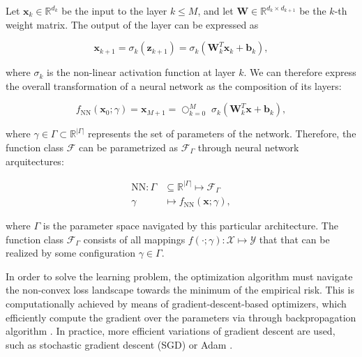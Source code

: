 \begin{definition}
    Let $\bm{x}_k \in \mathbb{R}^{d_k}$ be the input to the layer $k \leq M$, and 
    let $\bm{W} \in \mathbb{R}^{d_k \times d_{k+1}}$ be the $k$-th weight matrix. 
    The output of the layer can be expressed as
    
    $$
    \bm{x}_{k+1} = \sigma_k(\bm{z}_{k+1}) = \sigma_k(\bm{W}_k^T \bm{x}_k + \bm{b}_k),
    $$
    
    where $\sigma_k$ is the non-linear activation function at layer $k$. We 
    can therefore express the overall transformation of a neural network
    as the composition of its layers:
    
    $$
    f_{\operatorname{NN}}(\bm{x}_0; \gamma) = \bm{x}_{M+1} = \bigcirc_{k=0}^{M} \; \sigma_k(\bm{W}_k^T \bm{x} + \bm{b}_k),
    $$
    
    where $\gamma \in \Gamma \subset \mathbb{R}^{|\Gamma |}$ represents the set of parameters 
    of the network. Therefore, the function class $\mathcal{F}$ can be parametrized as $\mathcal{F}_{\Gamma}$ 
    through neural network arquitectures:

    $$
        \begin{aligned}
            \text{NN}: \Gamma & \subseteq \mathbb{R}^{|\Gamma |} \longmapsto \mathcal{F}_{\Gamma} \\
            \gamma & \longmapsto f_{\text{NN}}(\bm{x}; \gamma),
        \end{aligned}
    $$

    where $\Gamma$ is the parameter space navigated by this particular architecture. The function
    class $\mathcal{F}_{\Gamma}$ consists of all mappings $f(\cdot; \gamma): \mathcal{X} \longmapsto \mathcal{Y}$ that 
    that can be realized by some configuration $\gamma \in \Gamma$.
\end{definition}

In order to solve the learning problem, the optimization algorithm must navigate the non-convex loss
landscape towards the minimum of the empirical risk. This is computationally achieved 
by means of gradient-descent-based optimizers, which efficiently compute the
gradient over the parameters via through backpropagation algorithm 
\cite{rumelhartLearningRepresentationsBackpropagating1986}. In practice, more efficient
variations of gradient descent are used, such as stochastic gradient descent (SGD)
\cite{ruderOverviewGradientDescent2017} 
or Adam 
\cite{kingmaAdamMethodStochastic2017}. \\


